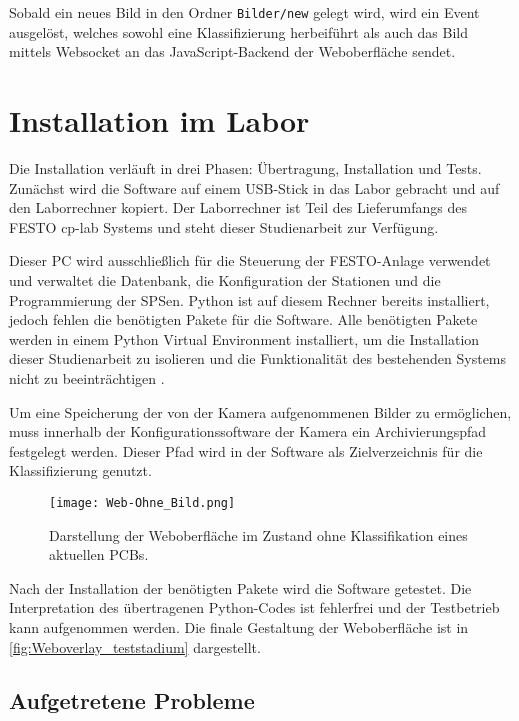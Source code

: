Sobald ein neues Bild in den Ordner \texttt{Bilder/new} gelegt wird, wird ein Event ausgelöst, welches sowohl eine Klassifizierung herbeiführt als auch das Bild mittels Websocket an das JavaScript-Backend der Weboberfläche sendet. 

\section{Installation im Labor} \label{sec:installation}

Die Installation verläuft in drei Phasen: Übertragung, Installation und Tests.
Zunächst wird die Software auf einem \ac{USB}-Stick in das Labor gebracht und auf den Laborrechner kopiert. 
Der Laborrechner ist Teil des Lieferumfangs des FESTO \ac{cp-lab} Systems und steht dieser Studienarbeit zur Verfügung.

Dieser \Ac{PC} wird ausschließlich für die Steuerung der FESTO-Anlage verwendet und verwaltet die Datenbank, die Konfiguration der Stationen und die Programmierung der \ac{SPS}en. 
Python ist auf diesem Rechner bereits installiert, jedoch fehlen die benötigten Pakete für die Software. 
Alle benötigten Pakete werden in einem Python Virtual Environment installiert, um die Installation dieser Studienarbeit zu isolieren und die Funktionalität des bestehenden Systems nicht zu beeinträchtigen \cite{python_software_foundation_venv_nodate}.

Um eine Speicherung der von der Kamera aufgenommenen Bilder zu ermöglichen, muss innerhalb der Konfigurationssoftware der Kamera ein Archivierungspfad festgelegt werden. Dieser Pfad wird in der Software als Zielverzeichnis für die Klassifizierung genutzt. 

\begin{figure}[H]
    \centering
    \texttt{[image: Web-Ohne\_Bild.png]}
    \caption{Darstellung der Weboberfläche im Zustand ohne Klassifikation eines aktuellen \ac{PCB}s.}
    \label{fig:Weboverlay_teststadium}
\end{figure}

Nach der Installation der benötigten Pakete wird die Software getestet. Die Interpretation des übertragenen Python-Codes ist fehlerfrei und der Testbetrieb kann aufgenommen werden. Die finale Gestaltung der Weboberfläche ist in \autoref{fig:Weboverlay_teststadium} dargestellt.

\subsection{Aufgetretene Probleme} \label{subsec:aufgetretene_probleme}

